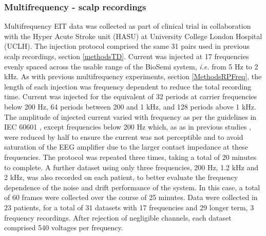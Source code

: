 \subsubsection{Multifrequency - scalp recordings}

Multifrequency EIT data was collected as part of clinical trial in collaboration with the Hyper Acute Stroke unit (HASU) at University College London Hospital (UCLH). The injection protocol comprised the same 31 pairs used in previous scalp recordings, section \ref{methodsTD}.  Current was injected at 17 frequencies evenly spaced across the usable range of the BioSemi system, \emph{i.e.} from 5 Hz to 2 kHz. As with previous multifrequency experiments, section \ref{MethodsRPFreq}, the length of each injection was frequency dependent to reduce the total recording time. Current was injected for the equivalent of 32 periods at carrier frequencies below 200 Hz, 64 periods between 200 and 1 kHz, and 128 periods above 1 kHz. The amplitude of injected current varied with frequency as per the guidelines in IEC 60601 \cite{IEC}, except frequencies below 200 Hz which, as as in previous studies \cite{McEwan_2006}, were reduced by half to ensure the current was not perceptible and to avoid saturation of the EEG amplifier due to the larger contact impedance at these frequencies. The protocol was repeated three times, taking a total of 20 minutes to complete. A further dataset using only three frequencies, 200 Hz, 1.2 kHz and 2 kHz, was also recorded on each patient, to better evaluate the frequency dependence of the noise and drift performance of the system. In this case, a total of 60 frames were collected over the course of 25 minutes. Data were collected in 23 patients, for a total of 31 datasets with 17 frequencies and 29 longer term, 3 frequency recordings. After rejection of negligible channels, each dataset comprised 540 voltages per frequency.  